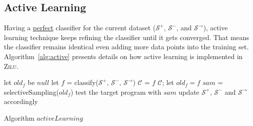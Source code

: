  



\subsection{Active Learning} 
\label{subsec:active:learning}
Having a \underline{perfect} classifier for the current dataset ($\mathcal{S}^+$, $\mathcal{S}^-$, and $\mathcal{S}^\rightarrow$), 
active learning technique keeps refining the classifier until it gets converged.
That means the classifier remains identical even adding more data points into the training set. 
Algorithm~\ref{alg:active} presents details on how active learning is implemented in \textsc{Zilu}. 

\begin{algorithm}[!h]
\SetAlgoVlined
\Indm
{}
\Indp
let $old_f$ be $null$\;
 {
    let $f$ = classify($\mathcal{S}^+$, $\mathcal{S}^-$, $\mathcal{S}^\rightarrow$)\;
     {
         {
            $\mathcal{C}$ = $f$\;
            \Return $\mathcal{C}$;
        }
        let $old_f = f$\;
    }
    $sam$ = selectiveSampling($old_f$)\;
    test the target program with $sam$\;
    update $\mathcal{S}^+$, $\mathcal{S}^-$ and $\mathcal{S}^\rightarrow$ accordingly\;
}
\caption{Algorithm $activeLearning$}
\label{alg:active}
\end{algorithm}

